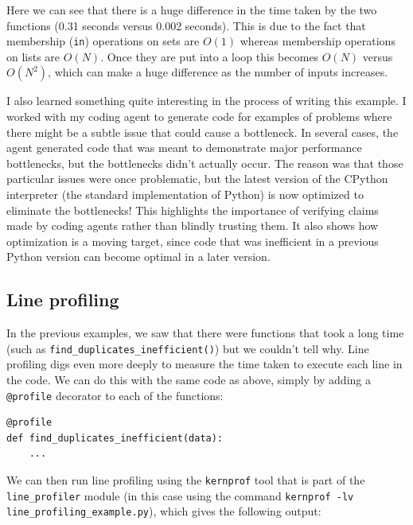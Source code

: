 Here we can see that there is a huge difference in the time taken by the two functions (0.31 seconds versus 0.002 seconds). This is due to the fact that membership (\texttt{in}) operations on sets are $O(1)$ whereas membership operations on lists are $O(N)$.  Once they are put into a loop this becomes $O(N)$ versus $O(N^2)$, which can make a huge difference as the number of inputs increases.

I also learned something quite interesting in the process of writing this example. I worked with my coding agent to generate code for examples of problems where there might be a subtle issue that could cause a bottleneck.  In several cases, the agent generated code that was meant to demonstrate major performance bottlenecks, but the bottlenecks didn't actually occur.  The reason was that those particular issues were once problematic, but the latest version of the CPython interpreter (the standard implementation of Python) is now optimized to eliminate the bottlenecks!  This highlights the importance of verifying claims made by coding agents rather than blindly trusting them.  It also shows how optimization is a moving target, since code that was inefficient in a previous Python version can become optimal in a later version.

\subsection{Line profiling}

In the previous examples, we saw that there were functions that took a long time (such as \texttt{find\_duplicates\_inefficient()}) but we couldn't tell why.  Line profiling digs even more deeply to measure the time taken to execute each line in the code.  We can do this with the same code as above, simply by adding a \texttt{@profile} decorator to each of the functions:

\begin{lstlisting}[style=Pythonshort]
@profile
def find_duplicates_inefficient(data):
    ...
\end{lstlisting}

We can then run line profiling using the \texttt{kernprof} tool that is part of the \texttt{line\_profiler} module (in this case using the command \texttt{kernprof -lv line\_profiling\_example.py}), which gives the following output:

